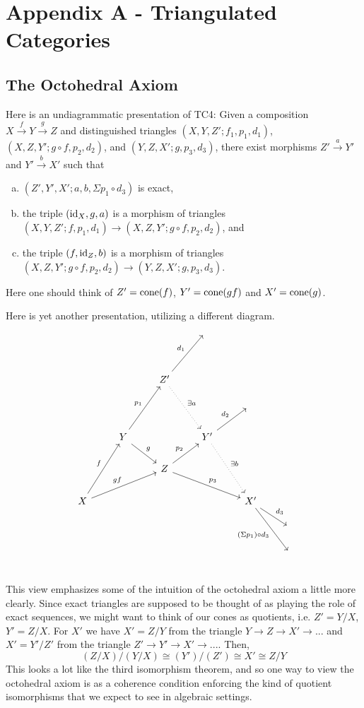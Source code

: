 \documentclass[11pt]{article}
\begin{document}

\newpage

\section{Appendix A - Triangulated Categories}
\subsection{The Octohedral Axiom}\label{octaxiom}
Here is an undiagrammatic presentation of TC4: Given a composition $X \xrightarrow{f} Y \xrightarrow{g} Z$ and distinguished triangles $(X,Y,Z'; f_1, p_1, d_1)$, $(X,Z,Y'; g\circ f, p_2, d_2)$, and $(Y,Z,X'; g, p_3, d_3)$, there exist morphisms $Z' \xrightarrow{a} Y'$ and $Y' \xrightarrow{b} X'$ such that
	\begin{enumerate}[(a)]
		\item $(Z',Y',X'; a,b,\Sigma p_1 \circ d_3)$ is exact,
		\item the triple $(\operatorname{id}_X,g,a)$ is a morphism of triangles $(X,Y,Z'; f,p_1,d_1) \to (X,Z,Y'; g\circ f,p_2,d_2)$, and
		\item the triple $(f,\operatorname{id}_Z,b)$ is a morphism of triangles $(X,Z,Y'; g\circ f, p_2, d_2) \to (Y,Z,X'; g, p_3, d_3)$.
	\end{enumerate}
	Here one should think of $Z' = \operatorname{cone}(f)$, $Y' = \operatorname{cone}(gf)$ and $X' = \operatorname{cone}(g)$.

Here is yet another presentation, utilizing a different diagram. 
\[\begin{tikzcd}
  &   &   & {} & &  \\
  &   &   &   &   &  \\
  &   & Z' \ar[ruu,"d_1"]\ar[ddr,"\exists a",dotted] &   &  &  \\
  &   &   &   & {}  &  \\
  & Y\ar[rd,"g"] \ar[ruu,"p_1"] &   & Y'\ar[ru,"d_2"] \ar[rdd,"\exists b", dotted]&   &  \\
  &   & Z \ar[ru,"p_2"] \ar[drr,"p_3"] &   &   &  \\
X \ar[ruu,"f"]  \ar[urr,"gf"]&   &   &   & X' \ar[rd,"d_3"] \ar[rdd,"(\Sigma p_1) \circ d_3"'] &  \\
  &   &   &   &   & {} \\
  &   &   &   &   & {} \\
\end{tikzcd}\]
This view emphasizes some of the intuition of the octohedral axiom a little more clearly. Since exact triangles are supposed to be thought of as playing the role of exact sequences, we might want to think of our cones as quotients, i.e. $Z' = Y/X$, $Y' = Z/X$. For $X'$ we have $X' = Z/Y$ from the triangle $Y \to Z \to X' \to ... $ and $X' = Y'/Z'$ from the triangle $Z' \to Y' \to X' \to ...$. Then, 
\[
	(Z/X)/(Y/X) \cong (Y')/(Z') \cong X' \cong Z/Y
\]
This looks a lot like the third isomorphism theorem, and so one way to view the octohedral axiom is as a coherence condition enforcing the kind of quotient isomorphisms that we expect to see in algebraic settings.
\end{document}
